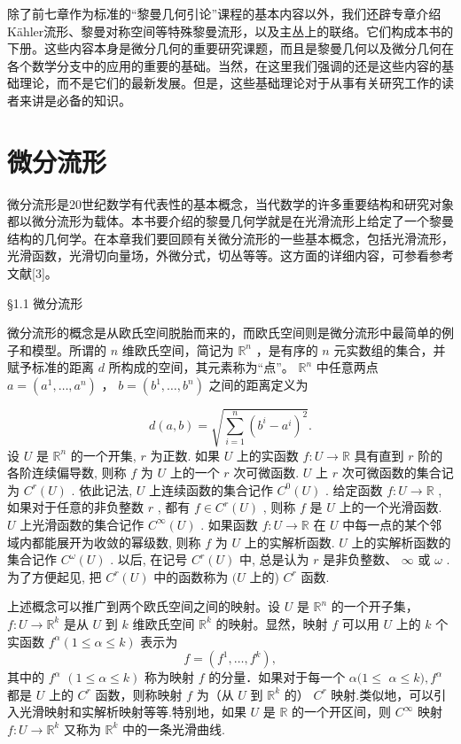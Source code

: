 除了前七章作为标准的“黎曼几何引论”课程的基本内容以外，我们还辟专章介绍Kähler流形、黎曼对称空间等特殊黎曼流形，以及主丛上的联络。它们构成本书的下册。这些内容本身是微分几何的重要研究课题，而且是黎曼几何以及微分几何在各个数学分支中的应用的重要的基础。当然，在这里我们强调的还是这些内容的基础理论，而不是它们的最新发展。但是，这些基础理论对于从事有关研究工作的读者来讲是必备的知识。

\chapter{ 微分流形}

微分流形是20世纪数学有代表性的基本概念，当代数学的许多重要结构和研究对象都以微分流形为载体。本书要介绍的黎曼几何学就是在光滑流形上给定了一个黎曼结构的几何学。在本章我们要回顾有关微分流形的一些基本概念，包括光滑流形，光滑函数，光滑切向量场，外微分式，切丛等等。这方面的详细内容，可参看参考文献[3]。

 §1.1 微分流形

微分流形的概念是从欧氏空间脱胎而来的，而欧氏空间则是微分流形中最简单的例子和模型。所谓的  $n$  维欧氏空间，简记为  $\mathbb{R}^n$ ，是有序的  $n$  元实数组的集合，并赋予标准的距离  $d$  所构成的空间，其元素称为“点”。 $\mathbb{R}^n$  中任意两点  $a = (a^1, \dots, a^n)$ ， $b = (b^1, \dots, b^n)$  之间的距离定义为

$$
d (a, b) = \sqrt {\sum_ {i = 1} ^ {n} \left(b ^ {i} - a ^ {i}\right) ^ {2}}.
$$
设  $U$  是  $\mathbb{R}^n$  的一个开集,  $r$  为正数. 如果  $U$  上的实函数  $f: U \to \mathbb{R}$  具有直到  $r$  阶的各阶连续偏导数, 则称  $f$  为  $U$  上的一个  $r$  次可微函数.  $U$  上  $r$  次可微函数的集合记为  $C^r(U)$ . 依此记法,  $U$  上连续函数的集合记作  $C^0(U)$ . 给定函数  $f: U \to \mathbb{R}$ , 如果对于任意的非负整数  $r$ , 都有  $f \in C^r(U)$ , 则称  $f$  是  $U$  上的一个光滑函数.  $U$  上光滑函数的集合记作  $C^\infty(U)$ . 如果函数  $f: U \to \mathbb{R}$  在  $U$  中每一点的某个邻域内都能展开为收敛的幂级数, 则称  $f$  为  $U$  上的实解析函数.  $U$  上的实解析函数的集合记作  $C^\omega(U)$ . 以后, 在记号  $C^r(U)$  中, 总是认为  $r$  是非负整数、 $\infty$  或  $\omega$ . 为了方便起见, 把  $C^r(U)$  中的函数称为  $(U$  上的)  $C^r$  函数.

上述概念可以推广到两个欧氏空间之间的映射。设  $U$  是  $\mathbb{R}^n$  的一个开子集， $f: U \to \mathbb{R}^k$  是从  $U$  到  $k$  维欧氏空间  $\mathbb{R}^k$  的映射。显然，映射  $f$  可以用  $U$  上的  $k$  个实函数  $f^\alpha (1 \leqslant \alpha \leqslant k)$  表示为
$$
f = (f ^ {1}, \dots , f ^ {k}),
$$
其中的  $f^{\alpha}$ $(1\leqslant \alpha \leqslant k)$  称为映射  $f$  的分量．如果对于每一个  $\alpha (1\leqslant$ $\alpha \leqslant k),f^{\alpha}$  都是  $U$  上的  $C^r$  函数，则称映射  $f$  为（从  $U$  到  $\mathbb{R}^k$  的）  $C^r$  映射.类似地，可以引入光滑映射和实解析映射等等.特别地，如果  $U$  是  $\mathbb{R}$  的一个开区间，则  $C^\infty$  映射  $f:U\to \mathbb{R}^{k}$  又称为  $\mathbb{R}^k$  中的一条光滑曲线.

